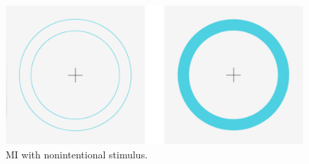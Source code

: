 \begin{figure}[H]
\begin{centering}
% 
\includegraphics[width=1\textwidth]{Appendix/databases/Figures/mi-nonintentional.png}
\par\end{centering}
\caption{\gls*{MI} with nonintentional stimulus.}
\label{}
\end{figure}
